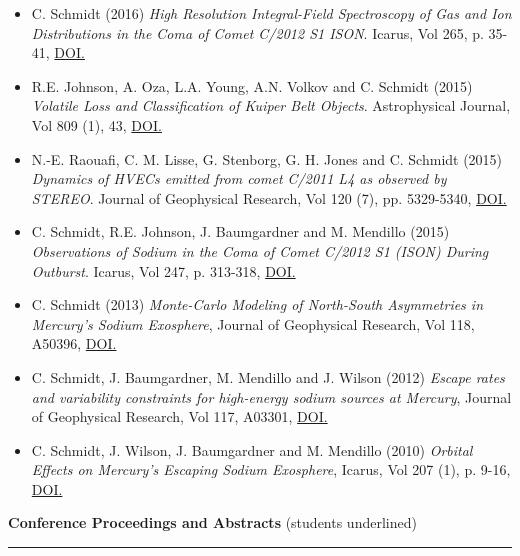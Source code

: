 \documentclass[12pt]{report}
\begin{document}
\begin{itemize}
  \item C. Schmidt (2016) \textit{High Resolution Integral-Field Spectroscopy of Gas and Ion Distributions in the Coma of Comet C/2012 S1 ISON}. Icarus, Vol 265, p. 35-41, \href{https://doi.org/10.1016/j.icarus.2015.10.009}{DOI.}
  \item R.E. Johnson, A. Oza, L.A. Young, A.N. Volkov and C. Schmidt (2015) \textit{Volatile Loss and Classification of Kuiper Belt Objects}. Astrophysical Journal, Vol 809 (1), 43, \href{https://doi.org/10.1088/0004-637X/809/1/43}{DOI.}
  \item N.-E. Raouafi, C. M. Lisse, G. Stenborg, G. H. Jones and C. Schmidt (2015) \textit{Dynamics of HVECs emitted from comet C/2011 L4 as observed by STEREO}. Journal of Geophysical Research, Vol 120 (7), pp. 5329-5340, \href{https://doi.org/10.1002/2014JA020926}{DOI.}
  \item C. Schmidt, R.E. Johnson, J. Baumgardner and M. Mendillo (2015) \textit{Observations of Sodium in the Coma of Comet C/2012 S1 (ISON) During Outburst}. Icarus, Vol 247, p. 313-318, \href{https://doi.org/10.1016/j.icarus.2014.10.022}{DOI.}
  \item C. Schmidt (2013) \textit{Monte-Carlo Modeling of North-South Asymmetries in Mercury's Sodium Exosphere}, Journal of Geophysical Research, Vol 118, A50396, \href{https://doi.org/10.1002/jgra.50396}{DOI.}
  \item C. Schmidt, J. Baumgardner, M. Mendillo and J. Wilson (2012) \textit{Escape rates and variability constraints for high-energy sodium sources at Mercury}, Journal of Geophysical Research, Vol 117, A03301, \href{https://doi.org/10.1029/2011JA017217}{DOI.}
  \item C. Schmidt, J. Wilson, J. Baumgardner and M. Mendillo (2010) \textit{Orbital Effects on Mercury's Escaping Sodium Exosphere}, Icarus, Vol 207 (1), p. 9-16, \href{https://doi.org/10.1016/j.icarus.2009.10.017}{DOI.}
 \end{itemize}
\vspace{2 mm}
\noindent\textbf{Conference Proceedings and Abstracts} (students underlined) \rm\hspace*{\fill} \\
\rule{\textwidth}{1pt}
\end{document}
